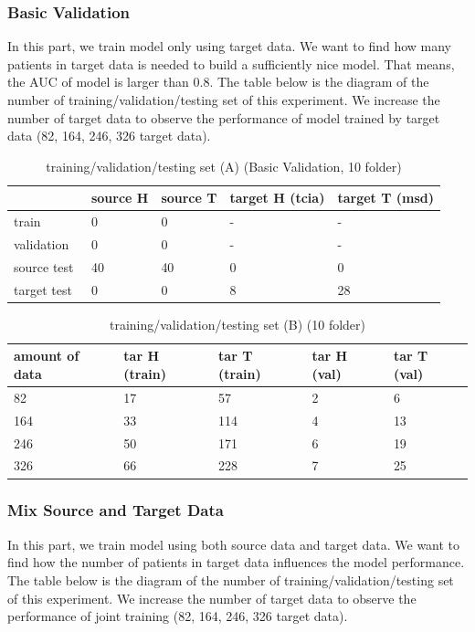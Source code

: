 \subsubsection{Basic Validation}
In this part, we train model only using target data. We want to find how many patients in target data is needed to build a sufficiently nice model. That means, the AUC of model is larger than 0.8. The table below is the diagram of the number of training/validation/testing set of this experiment. We increase the number of target data to observe the performance of model trained by target data (82, 164, 246, 326 target data).
\begin{table}[H]
\centering
\caption{training/validation/testing set (A) (Basic Validation, 10 folder)}
\begin{tabular}{|l|l|l|l|l|} 
\hline
~            & source H & source T & target H (tcia) & target T (msd)  \\ 
\hline
train        & 0      & 0      & -               & -               \\ 
\hline
validation   & 0       & 0       & -               & -               \\ 
\hline
source test  & 40       & 40       & 0               & 0               \\ 
\hline
target test~ & 0        & 0        & 8               & 28              \\
\hline
\end{tabular}
\end{table}

\begin{table}[H]
\centering 
\caption{training/validation/testing set (B) (10 folder)}
\begin{tabular}{|l|l|l|l|l|} 
\hline
amount of data   & tar H (train) & tar T (train) & tar H (val) & tar T (val)  \\ 
\hline
82        & 17      & 57      & 2               & 6               \\ 
\hline
164   & 33       & 114       & 4               & 13               \\ 
\hline
246  & 50       & 171       & 6               & 19               \\ 
\hline
326 & 66        & 228        & 7               & 25              \\
\hline
\end{tabular}
\end{table}

\subsubsection{Mix Source and Target Data}
In this part, we train model using both source data and target data. We want to find how the number of  patients in target data influences the model performance. The table below is the diagram of the number of training/validation/testing set of this experiment. We increase the number of target data to observe the performance of joint training (82, 164, 246, 326 target data).

